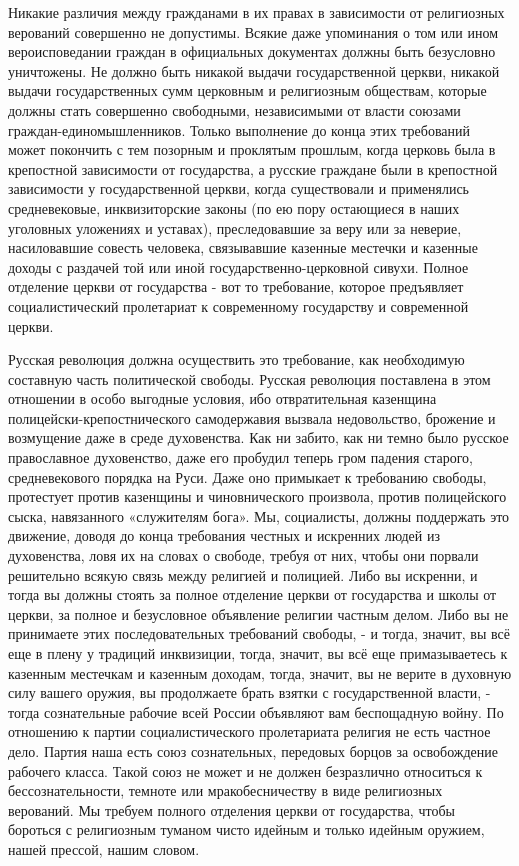 \documentclass[12pt]{article}
\newcommand{\parnum}{(\arabic{parcount})}
\newcounter{parcount}
\newenvironment{parnumbers}{%
  \par%
  \everypar{\noindent \stepcounter{parcount}\marginpar[]{\parnum}}%
}{}
\begin{document}
\begin{parnumbers}
Никакие различия между гражданами в их правах в зависимости от религиозных верований совершенно не допустимы. Всякие даже упоминания о том или ином вероисповедании граждан в официальных документах должны быть безусловно уничтожены. Не должно быть никакой выдачи государственной церкви, никакой выдачи государственных сумм церковным и религиозным обществам, которые должны стать совершенно свободными, независимыми от власти союзами граждан-единомышленников. Только выполнение до конца этих требований может покончить с тем позорным и проклятым прошлым, когда церковь была в крепостной зависимости от государства, а русские граждане были в крепостной зависимости у государственной церкви, когда существовали и применялись средневековые, инквизиторские законы (по ею пору остающиеся в наших уголовных уложениях и уставах), преследовавшие за веру или за неверие, насиловавшие совесть человека, связывавшие казенные местечки и казенные доходы с раздачей той или иной государственно-церковной сивухи. Полное отделение церкви от государства - вот то требование, которое предъявляет социалистический пролетариат к современному государству и современной церкви.

Русская революция должна осуществить это требование, как необходимую составную часть политической свободы. Русская революция поставлена в этом отношении в особо выгодные условия, ибо отвратительная казенщина полицейски-крепостнического самодержавия вызвала недовольство, брожение и возмущение даже в среде духовенства. Как ни забито, как ни темно было русское православное духовенство, даже его пробудил теперь гром падения старого, средневекового порядка на Руси. Даже оно примыкает к требованию свободы, протестует против казенщины и чиновнического произвола, против полицейского сыска, навязанного «служителям бога». Мы, социалисты, должны поддержать это движение, доводя до конца требования честных и искренних людей из духовенства, ловя их на словах о свободе, требуя от них, чтобы они порвали решительно всякую связь между религией и полицией. Либо вы искренни, и тогда вы должны стоять за полное отделение церкви от государства и школы от церкви, за полное и безусловное объявление религии частным делом. Либо вы не принимаете этих последовательных требований свободы, - и тогда, значит, вы всё еще в плену у традиций инквизиции, тогда, значит, вы всё еще примазываетесь к казенным местечкам и казенным доходам, тогда, значит, вы не верите в духовную силу вашего оружия, вы продолжаете брать взятки с государственной власти, - тогда сознательные рабочие всей России объявляют вам беспощадную войну. По отношению к партии социалистического пролетариата религия не есть частное дело. Партия наша есть союз сознательных, передовых борцов за освобождение рабочего класса. Такой союз не может и не должен безразлично относиться к бессознательности, темноте или мракобесничеству в виде религиозных верований. Мы требуем полного отделения церкви от государства, чтобы бороться с религиозным туманом чисто идейным и только идейным оружием, нашей прессой, нашим словом.


\end{parnumbers}
\end{document}
